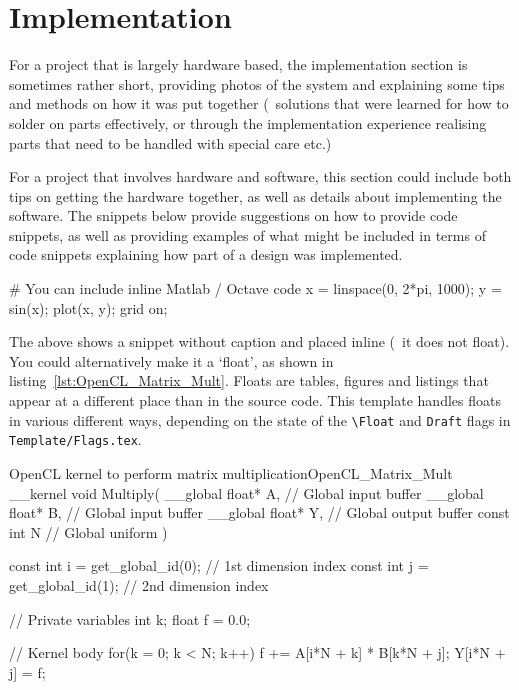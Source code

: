 \section{Implementation}

For a project that is largely hardware based, the implementation section is sometimes rather short, providing photos of the system and explaining some tips and methods on how it was put together (\eg~solutions that were learned for how to solder on parts effectively, or through the implementation experience realising parts that need to be handled with special care etc.)

For a project that involves hardware and software, this section could include both tips on getting the hardware together, as well as details about implementing the software.  The snippets below provide suggestions on how to provide code snippets, as well as providing examples of what might be included in terms of code snippets explaining how part of a design was implemented.

\begin{Matlab}
  # You can include inline Matlab / Octave code
  x = linspace(0, 2*pi, 1000);
  y = sin(x);
  plot(x, y); grid on;
\end{Matlab}

The above shows a snippet without caption and placed inline (\ie~it does not float).  You could alternatively make it a `float', as shown in listing~\ref{lst:OpenCL_Matrix_Mult}.  Floats are tables, figures and listings that appear at a different place than in the source code.  This template handles floats in various different ways, depending on the state of the \verb|\Float| and \verb|Draft| flags in \verb|Template/Flags.tex|.

\begin{OpenCL_float}{OpenCL kernel to perform matrix multiplication}{OpenCL_Matrix_Mult}
  __kernel void Multiply(
    __global float* A, // Global input buffer
    __global float* B, // Global input buffer
    __global float* Y, // Global output buffer
    const    int    N  // Global uniform
  ){
    const int i = get_global_id(0); // 1st dimension index
    const int j = get_global_id(1); // 2nd dimension index
    
    // Private variables
    int   k;
    float f = 0.0;
    
    // Kernel body
    for(k = 0; k < N; k++) f += A[i*N + k] * B[k*N + j];
    Y[i*N + j] = f;
  }
\end{OpenCL_float}

